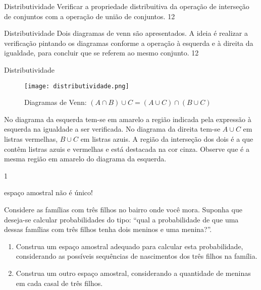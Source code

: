 \begin{objectives}{Distributividade}
{
Verificar a propriedade distribuitiva da operação de interseção de conjuntos com a operação de união de conjuntos.
}{1}{2}
\end{objectives}
\begin{sugestions}{Distributividade}
{
Dois diagramas de venn são apresentados. A ideia é realizar a verificação pintando os diagramas conforme a operação à esquerda e à direita da igualdade, para concluir que se referem ao mesmo conjunto.
}{1}{2}
\end{sugestions}
\begin{answer}{Distributividade}
{
\begin{figure}[H]
\centering

\texttt{[image: distributividade.png]}
\caption{Diagramas de Venn: $(A\cap B)\cup C=(A\cup C)\cap(B\cup C)$}

\end{figure}

No diagrama da esquerda tem-se em amarelo a região indicada pela expressão à esquerda na igualdade a ser verificada. No diagrama da direita tem-se $A\cup C$ em listras vermelhas, $B\cup C$ em listras azuis. A região da interseção dos dois é a que contêm listras azuis e vermelhas e está destacada na cor cinza. Observe que é a mesma região em amarelo do diagrama da esquerda.
}{1}
\end{answer}
\begin{task}{espaço amostral não é único!}
\label{espaço-nao-unico}


Considere as famílias com três filhos no bairro onde você mora. Suponha que deseja-se calcular probabilidades do tipo: “qual a probabilidade de que uma dessas famílias com três filhos tenha dois meninos e uma menina?”.
\begin{enumerate}
\item {} 
Construa um espaço amostral adequado para calcular esta probabilidade, considerando as possíveis sequências de nascimentos dos três filhos na família.

\item {} 
Construa um outro espaço amostral, considerando a quantidade de meninas em cada casal de três filhos.

\end{enumerate}
\end{task}

